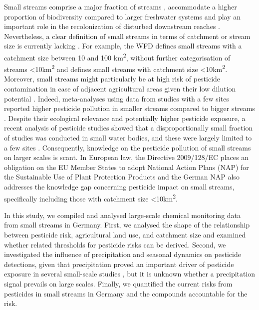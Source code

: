Small streams comprise a major fraction of streams \citep{nadeau_hydrological_2007}, accommodate a higher proportion of biodiversity compared to larger freshwater systems \citep{davies_comparison_2008, biggs_report_2014} and play an important role in the recolonization of disturbed downstream reaches \citep{liess_analyzing_2005, orlinskiy_forested_2015}.
Nevertheless, a clear definition of small streams in terms of catchment or stream size is currently lacking \citep{lorenz_specifics_2016}. 
For example, the WFD defines small streams with a catchment size between 10 and 100 km\textsuperscript{2}, without further categorisation of streams \textless 10km\textsuperscript{2} and \citet{lorenz_specifics_2016} defines small streams with catchment size \textless 10km\textsuperscript{2}. 
Moreover, small streams might particularly be at high risk of pesticide contamination in case of adjacent agricultural areas given their low dilution potential \citep{schulz_field_2004,liess_determination_1999}.
Indeed, meta-analyses using data from studies with a few sites reported higher pesticide pollution in smaller streams compared to bigger streams \citep{stehle_pesticide_2015,schulz_field_2004}. 
Despite their ecological relevance and potentially higher pesticide exposure, a recent analysis of pesticide studies showed that a disproportionally small fraction of studies was conducted in small water bodies, and these were largely limited to a few sites \citep{lorenz_specifics_2016}. 
Consequently, knowledge on the pesticide pollution of small streams on larger scales is scant. 
In European law, the Directive 2009/128/EC \citep{European_Union_2009} places an obligation on the EU Member States to adopt National Action Plans (NAP) for the Sustainable Use of Plant Protection Products and the German NAP also addresses the knowledge gap concerning pesticide impact on small streams, specifically including those with catchment size \textless 10km\textsuperscript{2}.

In this study, we compiled and analysed large-scale chemical monitoring data from small streams in Germany. 
First, we analysed the shape of the relationship between pesticide risk, agricultural land use, and catchment size and examined whether related thresholds for pesticide risks can be derived. 
Second, we investigated the influence of precipitation and seasonal dynamics on pesticide detections, given that precipitation proved an important driver of pesticide exposure in several small-scale studies \citep{wittmer_significance_2010,schulz_field_2004}, but it is unknown whether a precipitation signal prevails on large scales. 
Finally, we quantified the current risks from pesticides in small streams in Germany and the compounds accountable for the risk.



